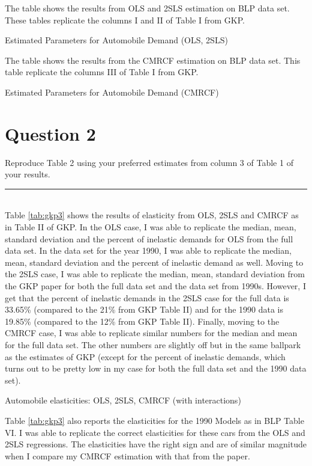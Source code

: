 \documentclass[11pt,letterpaper]{article}
\newcommand{\floatintro}[1]{
  
  \vspace*{0.1in}
  
  {\footnotesize

    #1
    
  }
  
  \vspace*{0.1in} } \newcommand{\Hline}{\noindent\rule{18cm}{0.5pt}}
\begin{document}
\begin{table}[htbp!]
  \floatintro{The table shows the results from OLS and 2SLS estimation
    on BLP data set. These tables replicate the columns I and II of
    Table I from GKP.}
  \centering
  \footnotesize{
    }
  \caption{Estimated Parameters for Automobile Demand (OLS, 2SLS)}
  \label{tab:gkp1}
\end{table}

\begin{table}[htbp!]
  \floatintro{The table shows the results from the CMRCF estimation
    on BLP data set. This table replicate the columns III of
    Table I from GKP.}
  \centering
  \footnotesize{
    }
  \caption{Estimated Parameters for Automobile Demand (CMRCF)}
  \label{tab:gkp2}
\end{table}

\section*{Question 2}
Reproduce Table 2 using your preferred estimates from column 3 of
Table 1 of your results. \\ \Hline \\
Table \ref{tab:gkp3} shows the results of elasticity from OLS, 2SLS
and CMRCF as in Table II of GKP. In the OLS case, I was able to
replicate the median, mean, standard deviation and the percent of
inelastic demands for OLS from the full data set. In the data set for
the year 1990, I was able to replicate the median, mean, standard
deviation and the percent of inelastic demand as well.  Moving to the
2SLS case, I was able to replicate the median, mean, standard
deviation from the GKP paper for both the full data set and the data
set from 1990s. However, I get that the percent of inelastic demands
in the 2SLS case for the full data is 33.65\% (compared to the 21\%
from GKP Table II) and for the 1990 data is 19.85\% (compared to the
12\% from GKP Table II). Finally, moving to the CMRCF case, I was able
to replicate similar numbers for the median and mean for the full data
set. The other numbers are slightly off but in the same ballpark as
the estimates of GKP (except for the percent of inelastic demands,
which turns out to be pretty low in my case for both the full data set
and the 1990 data set).
\begin{table}
  \centering
  
  \caption{Automobile elasticities: OLS, 2SLS, CMRCF (with
    interactions)}
  \label{tab:gkp3}
\end{table}
Table \ref{tab:gkp3} also reports the elasticities for the 1990 Models
as in BLP Table VI. I was able to replicate the correct elasticities
for these cars from the OLS and 2SLS regressions. The elasticities
have the right sign and are of similar magnitude when I compare my
CMRCF estimation with that from the paper.


\end{document}
